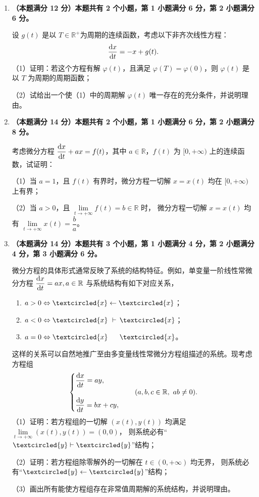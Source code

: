 \begin{enumerate}
\item \textbf{（本题满分 12 分）本题共有 2 个小题，第 1 小题满分 6 分，第 2 小题满分 6 分。}

设 $g(t)$ 是以 $T \in \mathbb{R}^{+}$为周期的连续函数，考虑以下非齐次线性方程：
$$\frac{{\rm d}x}{{\rm d}t}=-x+g(t).$$
（1）证明：若这个方程有解 $\varphi(t)$，且满足 $\varphi(T)=\varphi(0)$，则 $\varphi(t)$ 是以 $T$ 为周期的周期函数；

（2）试给出一个使（1）中的周期解 $\varphi(t)$ 唯一存在的充分条件，并说明理由。

\item \textbf{（本题满分 14 分）本题共有 2 个小题，第 1 小题满分 6 分，第 2 小题满分 8 分。}

考虑微分方程 $\dfrac{{\rm d}x}{\mathrm{d}t}+ax=f(t)$，其中 $a \in \mathbb{R}$，$f(t)$ 为 $[0,+\infty)$ 上的连续函数，试证明：

（1）当 $a=1$，且 $f(t)$ 有界时，微分方程一切解 $x=x(t)$ 均在 $[0,+\infty)$ 上有界；

（2）当 $a>0$，且 $\lim\limits_{t \rightarrow+\infty} f(t)=b \in \mathbb{R}$ 时，
微分方程一切解 $x=x(t)$ 均有 $\lim\limits_{t \rightarrow+\infty} x(t)=\dfrac{b}{a}$。

\item \textbf{（本题满分 14 分）本题共有 3 个小题，第 1 小题满分 4 分，第 2 小题满分 4 分，第 3 小题满分 6 分。}

微分方程的具体形式通常反映了系统的结构特征。例如，单变量一阶线性常微分方程 $\dfrac{{\rm d}x}{{\rm d}t}=ax, a \in \mathbb{R}$ 与系统结构有如下对应关系，
\begin{enumerate}[label=(\roman*)]
\item $a>0 \Leftrightarrow \textcircled{x} \leftarrow \textcircled{x}$；\\
\item $a<0 \Leftrightarrow \textcircled{x} \ \vdash\, \textcircled{x}$；\\
\item $a=0 \Leftrightarrow \textcircled{x} \ \ \quad \textcircled{x}$。
\end{enumerate}
这样的关系可以自然地推广至由多变量线性常微分方程组描述的系统。现考虑方程组
$$\begin{cases}
\dfrac{{\rm d}x}{{\rm d}t}=ay, \\ \\
\dfrac{{\rm d}y}{{\rm d}t}=bx+cy,
\end{cases} \quad(a, b, c \in \mathbb{R},\ ab \neq 0).$$
（1）证明：若方程组的一切解 $(x(t),y(t))$ 均满足 $\lim\limits_{t \rightarrow+\infty}(x(t),y(t))=(0,0)$，
则系统必有``$\textcircled{y}\vdash\textcircled{y}$''结构；

（2）证明：若方程组除零解外的一切解在 $t \in(0,+\infty)$ 均无界，
则系统必有``$\textcircled{y}\leftarrow\textcircled{y}$''结构；

（3）画出所有能使方程组存在非常值周期解的系统结构，并说明理由。
\end{enumerate}

